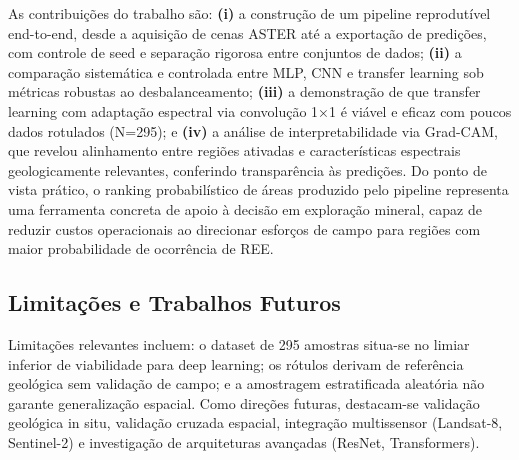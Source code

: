 \documentclass[12pt,twocolumn]{article}
\begin{document}
As contribuições do trabalho são: \textbf{(i)} a construção de um pipeline reprodutível end-to-end, desde a aquisição de cenas ASTER até a exportação de predições, com controle de seed e separação rigorosa entre conjuntos de dados; \textbf{(ii)} a comparação sistemática e controlada entre MLP, CNN e transfer learning sob métricas robustas ao desbalanceamento; \textbf{(iii)} a demonstração de que transfer learning com adaptação espectral via convolução 1×1 é viável e eficaz com poucos dados rotulados (N=295); e \textbf{(iv)} a análise de interpretabilidade via Grad-CAM, que revelou alinhamento entre regiões ativadas e características espectrais geologicamente relevantes, conferindo transparência às predições. Do ponto de vista prático, o ranking probabilístico de áreas produzido pelo pipeline representa uma ferramenta concreta de apoio à decisão em exploração mineral, capaz de reduzir custos operacionais ao direcionar esforços de campo para regiões com maior probabilidade de ocorrência de REE.

\subsection{Limitações e Trabalhos Futuros}\label{limitauxe7uxf5es-e-trabalhos-futuros}

Limitações relevantes incluem: o dataset de 295 amostras situa-se no limiar inferior de viabilidade para deep learning; os rótulos derivam de referência geológica sem validação de campo; e a amostragem estratificada aleatória não garante generalização espacial. Como direções futuras, destacam-se validação geológica in situ, validação cruzada espacial, integração multissensor (Landsat-8, Sentinel-2) e investigação de arquiteturas avançadas (ResNet, Transformers).



\end{document}
